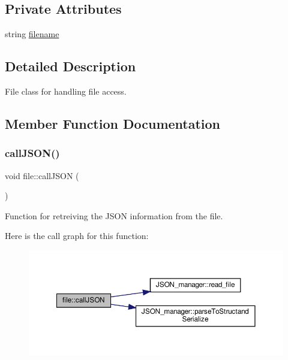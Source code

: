 \subsection*{Private Attributes}
\begin{DoxyCompactItemize}
\item 
string \hyperlink{classfile_a9117ee5ddda3538f631fe96252de70fc}{filename}
\end{DoxyCompactItemize}


\subsection{Detailed Description}
File class for handling file access. 

\subsection{Member Function Documentation}
\mbox{\label{classfile_a6f3aeac1f4b08cd52b7879ea999fded1}} 
\subsubsection{\texorpdfstring{call\+J\+S\+O\+N()}{callJSON()}}
{\footnotesize\ttfamily void file\+::call\+J\+S\+ON (\begin{DoxyParamCaption}{ }\end{DoxyParamCaption})}



Function for retreiving the J\+S\+ON information from the file. 

Here is the call graph for this function\+:
\nopagebreak
\begin{figure}[H]
\begin{center}
\leavevmode
\includegraphics[width=350pt]{classfile_a6f3aeac1f4b08cd52b7879ea999fded1_cgraph}
\end{center}
\end{figure}
\mbox{\label{classfile_a04d228a8eabeb75ed6f6f7c87f5053db}} 
